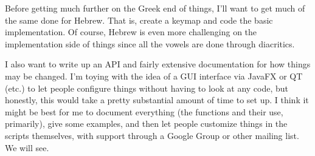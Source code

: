 \documentclass[11pt]{article}
\begin{document}
Before getting much further on the Greek end of things, I'll want to get much of the same done for Hebrew. That is, create a keymap and code the basic implementation. Of course, Hebrew is even more challenging on the implementation side of things since all the vowels are done through diacritics.

I also want to write up an API and fairly extensive documentation for how things may be changed. I'm toying with the idea of a GUI interface via JavaFX or QT (etc.) to let people configure things without having to look at any code, but honestly, this would take a pretty substantial amount of time to set up. I think it might be best for me to document everything (the functions and their use, primarily), give some examples, and then let people customize things in the scripts themselves, with support through a Google Group or other mailing list. We will see.
\end{document}
